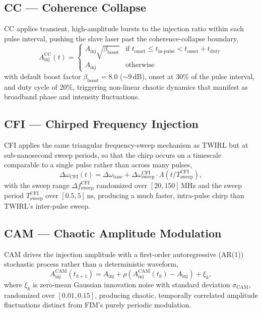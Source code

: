 \documentclass[12pt, a4paper]{report}
\begin{document}
\subsection{CC — Coherence Collapse}
CC applies transient, high-amplitude bursts to the injection ratio within each pulse interval, pushing the slave laser past the coherence-collapse boundary,
\begin{equation}
    A_{\text{inj}}^{\text{CC}}(t) = \begin{cases}
        A_{\text{inj}} \sqrt{\beta_{\text{boost}}} & \text{if } t_{\text{onset}} \leq t_{\text{in-pulse}} < t_{\text{onset}} + t_{\text{duty}} \\
        A_{\text{inj}} & \text{otherwise}
    \end{cases}
\end{equation}
with default boost factor $\beta_{\text{boost}} = 8.0$ ($\sim$9\,dB), onset at 30\% of the pulse interval, and duty cycle of 20\%, triggering non-linear chaotic dynamics that manifest as broadband phase and intensity fluctuations.

\subsection{CFI — Chirped Frequency Injection}
CFI applies the same triangular frequency-sweep mechanism as TWIRL but at sub-nanosecond sweep periods, so that the chirp occurs on a timescale comparable to a single pulse rather than across many pulses,
\begin{equation}
    \Delta\omega_{\text{CFI}}(t) = \Delta\omega_{\text{base}} + \Delta\omega_{\text{sweep}}^{\text{CFI}} \cdot \Lambda(t / T_{\text{sweep}}^{\text{CFI}}),
\end{equation}
with the sweep range $\Delta f_{\text{sweep}}^{\text{CFI}}$ randomized over $[20, 150]\,\text{MHz}$ and the sweep period $T_{\text{sweep}}^{\text{CFI}}$ over $[0.5, 5]\,\text{ns}$, producing a much faster, intra-pulse chirp than TWIRL's inter-pulse sweep.

\subsection{CAM — Chaotic Amplitude Modulation}
CAM drives the injection amplitude with a first-order autoregressive (AR(1)) stochastic process rather than a deterministic waveform,
\begin{equation}
    A_{\text{inj}}^{\text{CAM}}(t_{k+1}) = A_{\text{inj}} + \rho\left(A_{\text{inj}}^{\text{CAM}}(t_k) - A_{\text{inj}}\right) + \xi_k,
\end{equation}
where $\xi_k$ is zero-mean Gaussian innovation noise with standard deviation $\sigma_{\text{CAM}}$, randomized over $[0.01, 0.15]$, producing chaotic, temporally correlated amplitude fluctuations distinct from FIM's purely periodic modulation.
\end{document}

